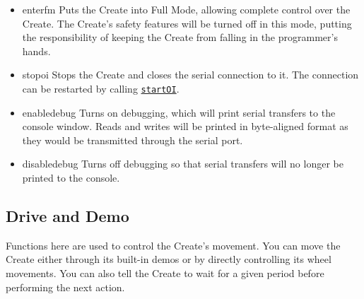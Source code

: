 \documentclass {article}
\begin{document}
\begin {itemize}
\item {} {enterfm} Puts the Create into
  Full Mode, allowing complete control over the Create.  The Create's
  safety features will be turned off in this mode, putting the
  responsibility of keeping the
  Create from falling in the programmer's hands. \\
  \retnorm

\item {} {stopoi} Stops the Create and closes the
  serial connection to it.  The connection can be restarted
  by calling \hyperlink {startoi}{{\tt startOI}}. \\
  \retnorm

\item {} {enabledebug} Turns on
  debugging, which will print serial transfers to the console window.
  Reads and writes will be printed in byte-aligned format as they
  would be transmitted through the serial port.

\item {} {disabledebug} Turns off
  debugging so that serial transfers will no longer be printed to the
  console.
\end {itemize}

\subsection {Drive and Demo}
Functions here are used to control the Create's movement.  You can
move the Create either through its built-in demos or by directly
controlling its wheel movements.  You can also tell the Create to wait
for a given period before performing the next action.
\end{document}
